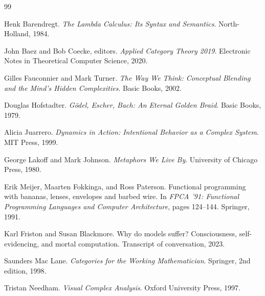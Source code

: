\documentclass[12pt, a4paper]{article}
\theoremstyle{plain}
\theoremstyle{definition}
\theoremstyle{remark}
\begin{document}
\begin{thebibliography}{99}

Henk Barendregt.
\textit{The Lambda Calculus: Its Syntax and Semantics}.
North-Holland, 1984.

John Baez and Bob Coecke, editors.
\textit{Applied Category Theory 2019}.
Electronic Notes in Theoretical Computer Science, 2020.

Gilles Fauconnier and Mark Turner.
\textit{The Way We Think: Conceptual Blending and the Mind's Hidden
Complexities}.
Basic Books, 2002.

Douglas Hofstadter.
\textit{G\"{o}del, Escher, Bach: An Eternal Golden Braid}.
Basic Books, 1979.

Alicia Juarrero.
\textit{Dynamics in Action: Intentional Behavior as a Complex System}.
MIT Press, 1999.

George Lakoff and Mark Johnson.
\textit{Metaphors We Live By}.
University of Chicago Press, 1980.

Erik Meijer, Maarten Fokkinga, and Ross Paterson.
Functional programming with bananas, lenses, envelopes and barbed wire.
In \textit{FPCA '91: Functional Programming Languages and Computer
Architecture}, pages 124--144. Springer, 1991.

Karl Friston and Susan Blackmore.
Why do models suffer? Consciousness, self-evidencing, and mortal computation.
Transcript of conversation, 2023.

Saunders Mac Lane.
\textit{Categories for the Working Mathematician}.
Springer, 2nd edition, 1998.

Tristan Needham.
\textit{Visual Complex Analysis}.
Oxford University Press, 1997.

\end{thebibliography}
\end{document}
